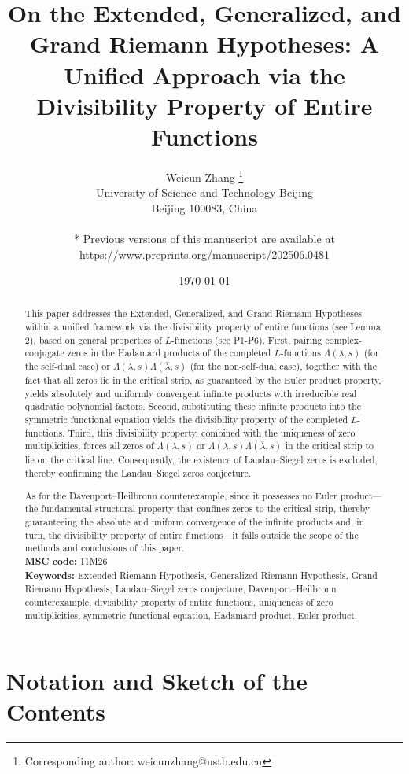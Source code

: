 \documentclass[12pt]{article}
\title{On the Extended, Generalized, and Grand Riemann Hypotheses: A Unified Approach via the Divisibility Property of Entire Functions}
\author{Weicun Zhang \thanks{Corresponding author: weicunzhang@ustb.edu.cn}\\ University of Science and Technology Beijing\\Beijing 100083, China\\\\
* Previous versions of this manuscript are available at \\https://www.preprints.org/manuscript/202506.0481}
\date{\today}
\begin{document}
\maketitle

\begin{abstract}

 This paper addresses the Extended, Generalized, and Grand Riemann Hypotheses within a unified framework via the divisibility property of entire functions (see Lemma 2), based on general properties of \(L\)-functions (see P1-P6). First, pairing complex-conjugate zeros in the Hadamard products of the completed \(L\)-functions \(\Lambda(\lambda, s)\) (for the self-dual case) or \(\Lambda(\lambda, s)\Lambda(\bar\lambda, s)\) (for the non-self-dual case), together with the fact that all zeros lie in the critical strip, as guaranteed by the Euler product property, yields absolutely and uniformly convergent infinite products with irreducible real quadratic polynomial factors. Second, substituting these infinite products into the symmetric functional equation yields the divisibility property of the completed \(L\)-functions. Third, this divisibility property, combined with the uniqueness of zero multiplicities, forces all zeros of \(\Lambda(\lambda, s)\) or \(\Lambda(\lambda, s)\Lambda(\bar\lambda, s)\) in the critical strip to lie on the critical line. Consequently, the existence of Landau–Siegel zeros is excluded, thereby confirming the Landau–Siegel zeros conjecture.

As for the Davenport--Heilbronn counterexample, since it possesses no Euler product---the fundamental structural property that confines zeros to the critical strip, thereby guaranteeing the absolute and uniform convergence of the infinite products and, in turn, the divisibility property of entire functions---it falls outside the scope of the methods and conclusions of this paper.\\

\textbf{MSC code:} 11M26\\

\textbf{Keywords:} Extended Riemann Hypothesis, Generalized Riemann Hypothesis, Grand Riemann Hypothesis, Landau–Siegel zeros conjecture, Davenport--Heilbronn counterexample, divisibility property of entire functions, uniqueness of zero multiplicities, symmetric functional equation, Hadamard product, Euler product.
\end{abstract}

\section{Notation and Sketch of the Contents}
\end{document}
